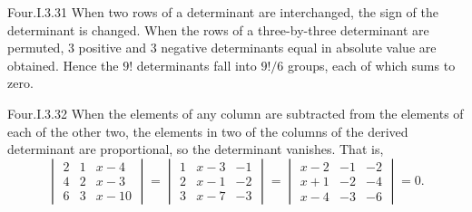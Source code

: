 \begin{ans}{Four.I.3.31}
      \answerasgiven
      When two rows of a determinant are interchanged, the sign of the
      determinant is changed.
      When the rows of a three-by-three determinant are permuted, \( 3 \)
      positive and \( 3 \) negative determinants equal in absolute value
      are obtained.
      Hence the \( 9! \) determinants fall into \( 9!/6 \) groups, each of
      which sums to zero.
    
\end{ans}
\begin{ans}{Four.I.3.32}
      \answerasgiven
      When the elements of any column are subtracted from the elements of
      each of the other two, the elements in two of the columns of the derived
      determinant are proportional, so the determinant vanishes.
      That is,
      \begin{equation*}
        \begin{vmatrix}
          2  &1    &x-4  \\
          4  &2    &x-3  \\
          6  &3    &x-10
        \end{vmatrix}=
        \begin{vmatrix}
          1    &x-3  &-1   \\
          2    &x-1  &-2   \\
          3    &x-7  &-3
        \end{vmatrix}=
        \begin{vmatrix}
          x-2  &-1   &-2   \\
          x+1  &-2   &-4   \\
          x-4  &-3   &-6
        \end{vmatrix}=0.
      \end{equation*}
    
\end{ans}

